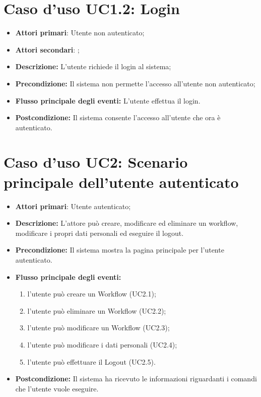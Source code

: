 		\section{Caso d'uso UC1.2: Login}
		\begin{itemize}
			\item \textbf{Attori primari}: Utente non autenticato;
			\item \textbf{Attori secondari}: ;
			\item \textbf{Descrizione:} L'utente richiede il login al sistema;
			\item \textbf{Precondizione:} Il sistema non permette l'accesso all'utente non autenticato;
			\item \textbf{Flusso principale degli eventi:} L'utente effettua il login.
			\item \textbf{Postcondizione:} Il sistema consente l'accesso all'utente che ora è autenticato.
		\end{itemize}
		\section{Caso d'uso UC2: Scenario principale dell'utente autenticato}
		\begin{itemize}
			\item \textbf{Attori primari}: Utente autenticato;
			\item \textbf{Descrizione:} L'attore può creare, modificare ed eliminare un workflow, modificare i propri dati personali ed eseguire il logout.
			\item \textbf{Precondizione:} Il sistema mostra la pagina principale per l'utente autenticato.
			\item \textbf{Flusso principale degli eventi:}
			\begin{enumerate}
				\item l'utente può creare un Workflow (UC2.1);
				\item l'utente può eliminare un Workflow (UC2.2);
				\item l'utente può modificare un Workflow (UC2.3);
				\item l'utente può modificare i dati personali (UC2.4);
				\item l'utente può effettuare il Logout (UC2.5).
			\end{enumerate}
			\item \textbf{Postcondizione:} Il sistema ha ricevuto le informazioni riguardanti i comandi che l'utente vuole eseguire.
		\end{itemize}
